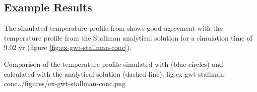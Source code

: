 

\subsection{Example Results}

The simulated temperature profile from \mf shows good agreement with the temperature profile from the Stallman analytical solution for a simulation time of 9.02 yr (figure \ref{fig:ex-gwt-stallman-conc}).  

\begin{StandardFigure}{
                                     Comparison of the temperature profile simulated with \mf (blue circles) and calculated with the \cite{stallman1965steady} analytical solution (dashed line).
                                     }{fig:ex-gwt-stallman-conc}{../figures/ex-gwt-stallman-conc.png}
\end{StandardFigure}